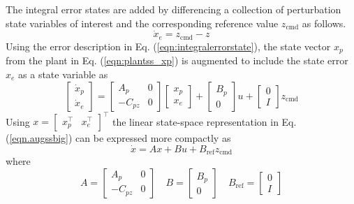 \documentclass[]{../sty/aiaa-tc}
\begin{document}
  The integral error states are added by differencing a collection of perturbation state variables of interest and the corresponding reference value $z_{\text{cmd}}$ as follows.
  \begin{equation}
    \label{eqn:integralerrorstate}
    \dot{x}_{e}=z_{\text{cmd}}-z
  \end{equation}
  Using the error description in Eq. (\ref{eqn:integralerrorstate}), the state vector $x_{p}$ from the plant in Eq. (\ref{eqn:plantss_xp}) is augmented to include the state error $x_{e}$ as a state variable as
  \begin{equation}
    \label{eqn.augssbig}
    \begin{bmatrix}
      \dot{x}_{p} \\
      \dot{x}_{e}
    \end{bmatrix} =
    \begin{bmatrix}
      A_{p} & 0 \\
      -C_{pz} & 0
    \end{bmatrix}
    \begin{bmatrix}
      x_{p} \\
      x_{e}
    \end{bmatrix}+
    \begin{bmatrix}
      B_{p} \\
      0
    \end{bmatrix}u+
    \begin{bmatrix}
      0 \\
      I
    \end{bmatrix}z_{\text{cmd}}
  \end{equation}
  Using $x=[\begin{array}{cc} x_{p}^{\top} & x_{e}^{\top} \end{array}]^{\top}$ the linear state-space representation in Eq. (\ref{eqn.augssbig}) can be expressed more compactly as
  \begin{equation}
    \label{eqn.augsssmall}
    \dot{x}=Ax+Bu+B_{\text{ref}}z_{\text{cmd}}
  \end{equation}
  where
  \begin{equation}
    A=
    \begin{bmatrix}
      A_{p} & 0 \\
      -C_{pz} & 0
    \end{bmatrix}
    \quad
    B=
    \begin{bmatrix}
      B_{p} \\
      0
    \end{bmatrix}
    \quad
    B_{\text{ref}}=
    \begin{bmatrix}
      0 \\
      I
    \end{bmatrix}
  \end{equation}
\end{document}
